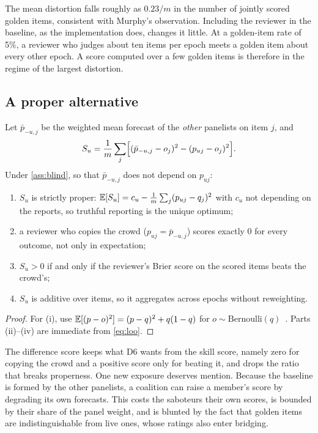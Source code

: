 \begin{finding}\label{find:bss}\empirical{}
The mean distortion falls roughly as $0.23/m$ in the number of jointly scored golden items,
consistent with Murphy's observation. Including the reviewer in the baseline, as the
implementation does, changes it little. At a golden-item rate of 5\%, a reviewer who judges about
ten items per epoch meets a golden item about every other epoch. A score computed over a few
golden items is therefore in the regime of the largest distortion.
\end{finding}

\subsection{A proper alternative}

\begin{proposition}\label{prop:loo}\proved{}
Let $\bar p_{-u,j}$ be the weighted mean forecast of the \emph{other} panelists on item $j$, and
\begin{equation}\label{eq:loo}
  S_u=\frac1m\sum_{j}\Bigl[(\bar p_{-u,j}-o_j)^2-(p_{uj}-o_j)^2\Bigr].
\end{equation}
Under \cref{ass:blind}, so that $\bar p_{-u,j}$ does not depend on $p_{uj}$:
\begin{enumerate}[label=(\roman*)]
  \item $S_u$ is strictly proper: $\mathbb{E}[S_u]=c_u-\frac1m\sum_j(p_{uj}-q_j)^2$ with $c_u$ not
    depending on the reports, so truthful reporting is the unique optimum;
  \item a reviewer who copies the crowd ($p_{uj}=\bar p_{-u,j}$) scores exactly $0$ for every
    outcome, not only in expectation;
  \item $S_u>0$ if and only if the reviewer's Brier score on the scored items beats the crowd's;
  \item $S_u$ is additive over items, so it aggregates across epochs without reweighting.
\end{enumerate}
\end{proposition}
\begin{proof}
For (i), use $\mathbb{E}[(p-o)^2]=(p-q)^2+q(1-q)$ for $o\sim\mathrm{Bernoulli}(q)$~\cite{gneiting2007scoring}.
Parts (ii)--(iv) are immediate from \eqref{eq:loo}.
\end{proof}

The difference score keeps what D6 wants from the skill score, namely zero for copying the crowd
and a positive score only for beating it, and drops the ratio that breaks properness. One new
exposure deserves mention. Because the baseline is formed by the other panelists, a coalition can
raise a member's score by degrading its own forecasts. This costs the saboteurs their own scores,
is bounded by their share of the panel weight, and is blunted by the fact that golden items are
indistinguishable from live ones, whose ratings also enter bridging.

